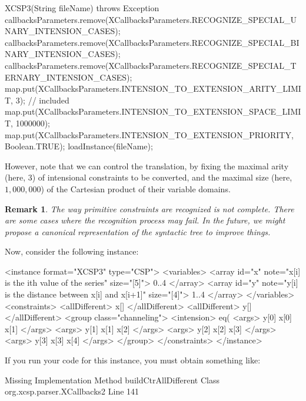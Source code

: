 \documentclass[10pt]{article}
\newenvironment{boxabsc}
               {\medskip \begin{bclogo}[barre=none,arrondi=0.2,logo=]{}\vspace{-0.6cm}}
               {\vspace{-0.1cm}\end{bclogo} \smallskip}
\newtheorem{remark}{Remark}
\begin{document}
\begin{boxabsc}
\begin{absc}
XCSP3(String fileName) throws Exception {
  callbacksParameters.remove(XCallbacksParameters.RECOGNIZE_SPECIAL_UNARY_INTENSION_CASES);
  callbacksParameters.remove(XCallbacksParameters.RECOGNIZE_SPECIAL_BINARY_INTENSION_CASES); 
  callbacksParameters.remove(XCallbacksParameters.RECOGNIZE_SPECIAL_TERNARY_INTENSION_CASES);
  map.put(XCallbacksParameters.INTENSION_TO_EXTENSION_ARITY_LIMIT, 3); // included
  map.put(XCallbacksParameters.INTENSION_TO_EXTENSION_SPACE_LIMIT, 1000000);
  map.put(XCallbacksParameters.INTENSION_TO_EXTENSION_PRIORITY, Boolean.TRUE);
  loadInstance(fileName); 
}
\end{absc} 
\end{boxabsc}

However, note that we can control the translation, by fixing the maximal arity (here, 3) of intensional constraints to be converted, and the maximal size (here, $1,000,000$) of the Cartesian product of their variable domains. 

\begin{remark}
The way primitive constraints are recognized is not complete. There are some cases where the recognition process may fail.
In the future, we might propose a canonical representation of the syntactic tree to improve things.
\end{remark}

Now, consider the following instance:

\begin{boxabsc}
\begin{absc}
<instance format="XCSP3" type="CSP">
  <variables>
    <array id="x" note="x[i] is the ith value of the series" size="[5]"> 0..4 </array>
    <array id="y" note="y[i] is the distance between x[i] and x[i+1]" size="[4]"> 1..4 </array>
  </variables>
  <constraints>
    <allDifferent> x[] </allDifferent>
    <allDifferent> y[] </allDifferent>
    <group class="channeling">
      <intension> eq(%
      <args> y[0] x[0] x[1] </args>
      <args> y[1] x[1] x[2] </args>
      <args> y[2] x[2] x[3] </args>
      <args> y[3] x[3] x[4] </args>
    </group>
  </constraints>
</instance>
\end{absc} 
\end{boxabsc}

If you run your code for this instance, you must obtain something like:

\begin{boxabsc}
\begin{absc}
Missing Implementation
  Method buildCtrAllDifferent
  Class org.xcsp.parser.XCallbacks2
  Line 141
\end{absc} 
\end{boxabsc}
\end{document}

